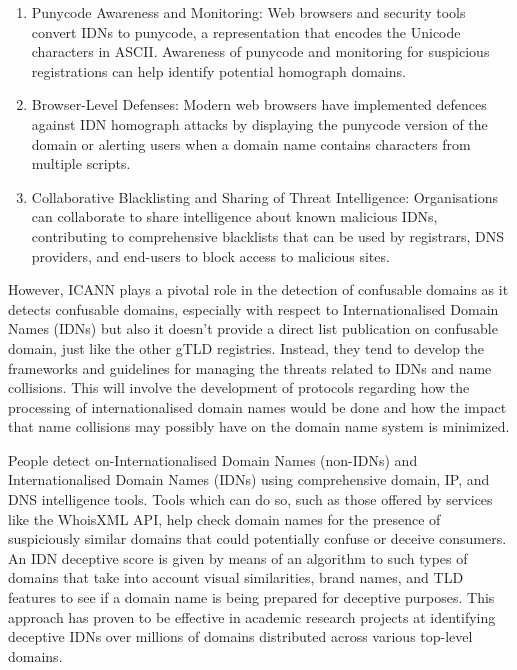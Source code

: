 \begin{enumerate}
  \item Punycode Awareness and Monitoring: Web browsers and security tools convert IDNs to punycode, a representation that encodes the Unicode characters in ASCII. Awareness of punycode and monitoring for suspicious registrations can help identify potential homograph domains. \cite{SOCRadar2023}
  \item Browser-Level Defenses: Modern web browsers have implemented defences against IDN homograph attacks by displaying the punycode version of the domain or alerting users when a domain name contains characters from multiple scripts. \cite{Malwarebytes2017}
  \item Collaborative Blacklisting and Sharing of Threat Intelligence: Organisations can collaborate to share intelligence about known malicious IDNs, contributing to comprehensive blacklists that can be used by registrars, DNS providers, and end-users to block access to malicious sites. \cite{CyberThreatAlliance2023}
  
\end{enumerate}


However, ICANN plays a pivotal role in the detection of confusable domains as it detects confusable domains, especially with respect to Internationalised Domain Names (IDNs) but also it doesn't provide a direct list publication on confusable domain, just like the other gTLD registries. Instead, they tend to develop the frameworks and guidelines for managing the threats related to IDNs and name collisions. This will involve the development of protocols regarding how the processing of internationalised domain names would be done and how the impact that name collisions may possibly have on the domain name system is minimized. \cite{ICANNIDNs}

People detect on-Internationalised Domain Names (non-IDNs) and Internationalised Domain Names (IDNs) using comprehensive domain, IP, and DNS intelligence tools. Tools which can do so, such as those offered by services like the WhoisXML API, help check domain names for the presence of suspiciously similar domains that could potentially confuse or deceive consumers. An IDN deceptive score is given by means of an algorithm to such types of domains that take into account visual similarities, brand names, and TLD features to see if a domain name is being prepared for deceptive purposes. This approach has proven to be effective in academic research projects at identifying deceptive IDNs over millions of domains distributed across various top-level domains. \cite{WhoisXMLAPI}

